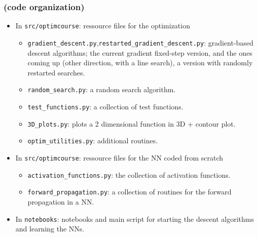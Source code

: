 \documentclass[12pt]{beamer}
\begin{document}
\begin{frame}
\frametitle{(code organization)} 
\vspace{-0.4cm}
\begin{itemize}
\small
\item In \texttt{src/optimcourse}: ressource files for the optimization 
\begin{itemize}
\small
\item \texttt{gradient\_descent.py},\texttt{restarted\_gradient\_descent.py}: gradient-based descent algorithms; the current gradient fixed-step version, and the ones coming up (other direction, with a line search), a version with randomly restarted searches.
\item \texttt{random\_search.py}: a random search algorithm.
\item \texttt{test\_functions.py}: a collection of test functions.
\item \texttt{3D\_plots.py}: plots a 2 dimensional function in 3D + contour plot.
\item \texttt{optim\_utilities.py}: additional routines.
\end{itemize}
\item In \texttt{src/optimcourse}: ressource files for the NN coded from scratch
\begin{itemize}
\small
\item \texttt{activation\_functions.py}: the collection of activation functions.
\item \texttt{forward\_propagation.py}: a collection of routines for the forward propagation in a NN.
\end{itemize}
\item In \texttt{notebooks}: notebooks and main script for starting the descent algorithms and learning the NNs.
\end{itemize}
\end{frame}
\end{document}
